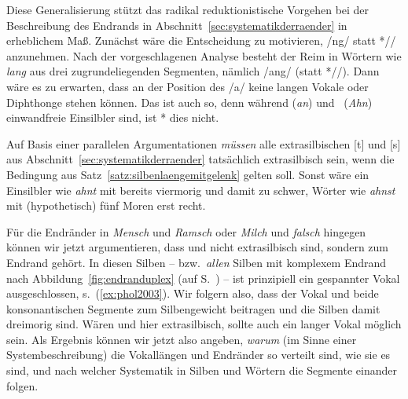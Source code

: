 Diese Generalisierung stützt das radikal reduktionistische Vorgehen bei der Beschreibung des Endrands in Abschnitt~\ref{sec:systematikderraender} in erheblichem Maß.
Zunächst wäre die Entscheidung zu motivieren, /ng/ statt *// anzunehmen.
Nach der vorgeschlagenen Analyse besteht der Reim in Wörtern wie \textit{lang} aus drei zugrundeliegenden Segmenten, nämlich /ang/ (statt *//).
Dann wäre es zu erwarten, dass an der Position des /a/ keine langen Vokale oder Diphthonge stehen können.
Das ist auch so, denn während \textipa{[Pan]} (\textit{an}) und\ \textipa{[Pa:n]} (\textit{Ahn}) einwandfreie Einsilbler sind, ist *\textipa{[Pa:N]} dies nicht.

Auf Basis einer parallelen Argumentationen \textit{müssen} alle extrasilbischen [t] und [s] aus Abschnitt~\ref{sec:systematikderraender} tatsächlich extrasilbisch sein, wenn die Bedingung aus Satz~\ref{satz:silbenlaengemitgelenk} gelten soll.
Sonst wäre ein Einsilbler wie \textit{ahnt} mit \textipa{[Pa:nt]} bereits viermorig und damit zu schwer, Wörter wie \textit{ahnst} mit (hypothetisch) fünf Moren erst recht.

Für die Endränder in \textit{Mensch} und \textit{Ramsch} oder \textit{Milch} und \textit{falsch} hingegen können wir jetzt argumentieren, dass \textipa{[S]} und \textipa{[\c{c}]} nicht extrasilbisch sind, sondern zum Endrand gehört.
In diesen Silben -- bzw.\ \textit{allen} Silben mit komplexem Endrand nach Abbildung~\ref{fig:endranduplex} (auf S.~\pageref{fig:endranduplex}) -- ist prinzipiell ein gespannter Vokal ausgeschlossen, s.\ (\ref{ex:phol2003}).
Wir folgern also, dass der Vokal und beide konsonantischen Segmente zum Silbengewicht beitragen und die Silben damit dreimorig sind.
Wären \textipa{[S]} und \textipa{[\c{c}]} hier extrasilbisch, sollte auch ein langer Vokal möglich sein.
Als Ergebnis können wir jetzt also angeben, \textit{warum} (im Sinne einer Systembeschreibung) die Vokallängen und Endränder so verteilt sind, wie sie es sind, und nach welcher Systematik in Silben und Wörtern die Segmente einander folgen.

\begin{exe}
  \ex \label{ex:phol2003}
  \begin{xlist}
    \ex *\textipa{[mE:nS]}
    \ex *\textipa{[ra:mS]}
    \ex *\textipa{[mi:l\c{c}]}
    \ex *\textipa{[fa:lS]}
  \end{xlist}
\end{exe}

